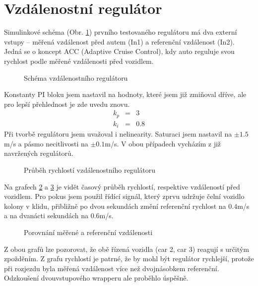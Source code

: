 \documentclass[thesis=M,czech,hidelinks]{FITthesis}[2012/06/26]
\begin{document}
\section{Vzdálenostní regulátor}
Simulinkové schéma (Obr. \ref{fig:pred}) prvního testovaného regulátoru má dva externí vstupy – měřená vzdálenost před autem (In1) a referenční vzdálenost (In2). Jedná se o koncept ACC (Adaptive Cruise Control), kdy auto reguluje svou rychlost podle měřené vzdálenosti před vozidlem.
\begin{figure}[h]
        \centering
        \caption{Schéma vzdálenostního regulátoru}
        \label{fig:pred}
\end{figure}

Konstanty PI bloku jsem nastavil na hodnoty, které jsem již zmiňoval dříve, ale pro lepší přehlednost je zde uvedu znovu.
\begin{eqnarray}
\label{konstanty2}
k_p &=& 3 \\ \nonumber
k_i &=& 0.8
\end{eqnarray}
Při tvorbě regulátoru jsem uvažoval i nelinearity. Saturaci jsem nastavil na $\pm1.5$m/s a pásmo necitlivosti na $\pm0.1$m/s. V obou případech vycházím z již navržených regulátorů. 
\begin{figure}[h]
        \centering
        \caption{Průběh rychlostí vzdálenostního regulátoru}
        \label{fig:predV}
\end{figure}

Na grafech \ref{fig:predV} a \ref{fig:predD} je vidět časový průběh rychlostí, respektive vzdáleností před vozidlem. Pro pokus jsem použil řídící signál, který zprvu udržuje čelní vozidlo kolony v klidu, přibližně po dvou sekundách změní referenční rychlost na $0.4$m/s a na dvanácti sekundách na $0.6$m/s.
\begin{figure}[h]
        \centering
        \caption{Porovnání měřené a referenční vzdálenosti}
        \label{fig:predD}
\end{figure}

Z obou grafů lze pozorovat, že obě řízená vozidla (car 2, car 3) reagují s určitým zpožděním. Z grafu rychlostí je patrné, že by mohl být regulátor rychlejší, protože při rozjezdu byla měřená vzdálenost více než dvojnásobkem referenční. Odzkoušení dvouvstupového wrapperu ale proběhlo úspěšně.
\end{document}
